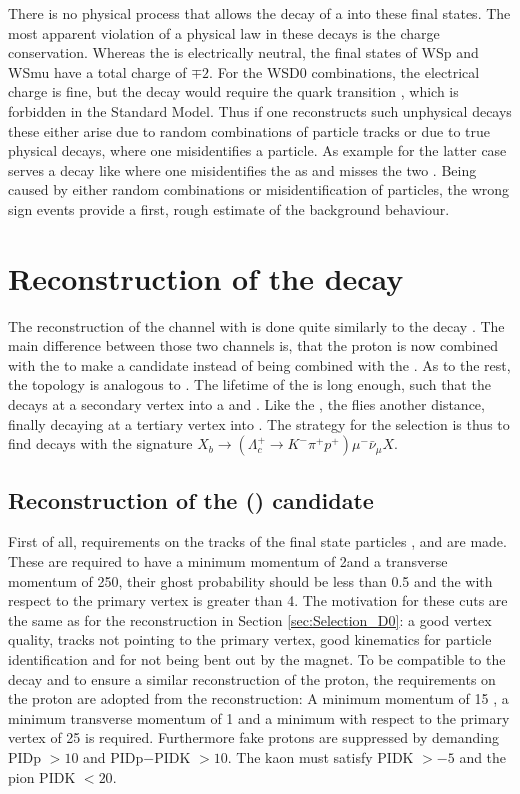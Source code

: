 There is no physical process that allows the decay of a \Lb into these final states.
The most apparent violation of a physical law in these decays is the charge conservation.
Whereas the \Lb is electrically neutral, the final states of WSp and WSmu have a total charge of $\mp 2$.
For the WSD0 combinations, the electrical charge is fine, but the decay \decay{\Lb}{\Dzb\proton\mun} would require the quark transition \bquark \to \cquarkbar, which is forbidden in the Standard Model.
Thus if one reconstructs such unphysical decays these either arise due to random combinations of particle tracks or due to true physical decays, where one misidentifies a particle.
As example for the latter case serves a decay like \decay{\Bz}{\Dz\mun\pip\pip\piz} where one misidentifies the \piz as \antiproton and misses the two \pip.
Being caused by either random combinations or misidentification of particles, the wrong sign events provide a first, rough estimate of the \LbToDpmunuX background behaviour.

\section{Reconstruction of the decay \LbToLcmunu}
The reconstruction of the \LbToLcmunu channel with \LcTopKpi is done quite similarly to the decay \LbToDpmunuX.
The main difference between those two channels is, that the proton is now combined with the \Km\pip to make a \LcTopKpi candidate instead of being combined with the \Dz\mun.
As to the rest, the topology is analogous to \LbToDpmunuX.
The lifetime of the \Lb is long enough, such that the \Lb decays at a secondary vertex into a \Lc and \mun.
Like the \Dz, the \Lc flies another distance, finally decaying at a tertiary vertex into \pKpi.
The strategy for the selection is thus to find decays with the signature $X_{b} \rightarrow (\Lambda_c^+ \rightarrow K^- \pi^+ p^+) \mu^- \bar{\nu}_{\mu} X$.

\subsection{Reconstruction of the \Lc (\pKpi) candidate}
First of all, requirements on the tracks of the final state particles \proton, \kaon and \pion are made.
These are required to have a minimum momentum of 2\gev and a transverse momentum of 250\mev, their ghost probability should be less than 0.5 and the \chisqip with respect to the primary vertex is greater than 4.
The motivation for these cuts are the same as for the \Dz reconstruction in Section \ref{sec:Selection_D0}:
a good vertex quality, tracks not pointing to the primary vertex, good kinematics for particle identification and for not being bent out by the magnet.
To be compatible to the \LbToDpmunuX decay and to ensure a similar reconstruction of the proton, the requirements on the proton are adopted from the \LbToDpmunuX reconstruction:
A minimum momentum of 15 \gev, a minimum transverse momentum of 1 \gev and a minimum \chisqip with respect to the primary vertex of 25 is required.
Furthermore fake protons are suppressed by demanding PIDp $> 10$ and PIDp$-$PIDK $> 10$.
The kaon must satisfy PIDK $>-5$ and the pion PIDK $< 20$.

